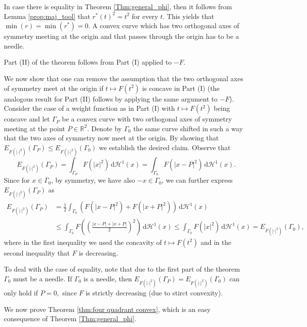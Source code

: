 \documentclass[10pt,leqno]{amsart}
\makeatletter
\newcommand{\R}[0]{\mathbb{R}}
\newcommand{\dHo}{\, \mathrm{d} \mathcal{H}^{1}}
\numberwithin{Theorem}{section}
\theoremstyle{definition}
\theoremstyle{remark}
\numberwithin{equation}{section}
\numberwithin{equation}{section}
\newenvironment{customproof}[1]{%
  \par\pushQED{\qed}%
  \normalfont\topsep6pt \trivlist
  \item[\hskip\labelsep\itshape
    Proof of #1\@addpunct{.}]\ignorespaces
}{%
  \popQED\endtrivlist\@endpefalse
}
\makeatother
\begin{document}
\begin{customproof}{Theorem \ref{Thm:general_phi}}
In case there is equality in Theorem \ref{Thm:general_phi}, then it follows from Lemma \ref{prop:maj_tool} that $r^*(t)^2=t^2$ for every $t.$ This yields that $\min(r)=\min(r^*)=0.$ A convex curve which has two orthogonal axes of symmetry meeting at the origin and that passes through the origin has to be a needle.

Part (II) of the theorem follows from Part (I) applied to $-F.$ 

We now show that one can remove the assumption that the two orthogonal axes of symmetry meet at the origin if $t \mapsto F(t^2)$ is  concave in Part (I) (the analogous result for Part (II) follows by applying the same argument to $-F$). Consider the case of a weight function as in Part (I) with $t \mapsto F(t^2)$ being concave and let $\Gamma_P$ be a convex curve with two orthogonal axes of symmetry meeting at the point $P \in \R^2$. Denote by $\Gamma_0$ the same curve shifted in such a way that the two axes of symmetry now meet at the origin. By showing that $E_{F(|\cdot|^2)}(\Gamma_P) \leq E_{F(|\cdot|^2)}(\Gamma_0)$ we establish the desired claim. Observe that 
\[
E_{F(|\cdot|^2)}(\Gamma_P) =\int_{\Gamma_P} F(|x|^2) \dHo(x) =\int_{\Gamma_0} F(|x-P|^2) \dHo(x). 
\]
Since for $x \in \Gamma_0$, by symmetry, we have also $-x \in \Gamma_0$, we can further express $E_{F(|\cdot|^2)}(\Gamma_P) $ as 
\begin{align*}
E_{F(|\cdot|^2)}(\Gamma_P) &= \frac{1}{2}\int_{\Gamma_0} \left(F(|x-P|^2) + F(|x+P|^2) \right) \dHo(x) \\
&\leq \int_{\Gamma_0} F \left( \left( \frac{|x-P| + |x+P|}{2} \right)^2 \right) \dHo(x) \leq \int_{\Gamma_0} F(|x|^2) \dHo(x)=E_{F(|\cdot|^2)}(\Gamma_0),
\end{align*}
where in the first inequality we used the concavity of $t \mapsto F(t^2)$ and in the second inequality that $F$ is decreasing.

To deal with the case of equality, note that due to the first part of the theorem $\Gamma_0$ must be a needle. If $\Gamma_0$ is a needle, then $E_{F(|\cdot|^2)}(\Gamma_P)= E_{F(|\cdot|^2)}(\Gamma_0)$ can only hold if $P=0,$ since $F$ is strictly decreasing (due to stirct convexity).

\end{customproof}

We now prove Theorem \ref{thm:four quadrant convex}, which is an easy consequence of Theorem \ref{Thm:general_phi}.
\end{document}
